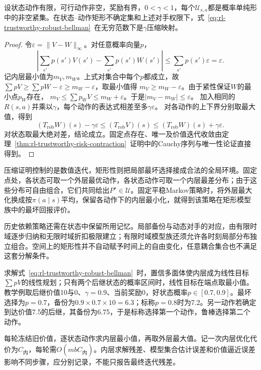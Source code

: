 \begin{theorem}[矩形鲁棒Bellman算子的压缩性]
  \label{thm:rl-trustworthy-robust-contraction}
  设状态动作有限，可行动作非空，奖励有界，$0<\gamma<1$，每个$\mathcal U_{s,a}$都是概率单纯形中的非空紧集。在状态--动作矩形不确定集和上述对手权限下，式~\eqref{eq:rl-trustworthy-robust-bellman}~在无穷范数下是$\gamma$压缩映射。
\end{theorem}
\begin{proof}
  令$\varepsilon=\lVert V-W\rVert_\infty$。对任意概率向量$p$，
  \[
    \left|\sum_{s'}p(s')V(s')-\sum_{s'}p(s')W(s')\right|
      \leq\sum_{s'}p(s')\varepsilon=\varepsilon.
  \]
  记内层最小值为$m_V,m_W$。上式对集合中每个$p$都成立，故
  $\sum pV\geq\sum pW-\varepsilon\geq m_W-\varepsilon$，取最小值得
  $m_V\geq m_W-\varepsilon$。由于紧性保证$W$的最小点$p_W$存在，
  $m_V\leq\sum p_WV\leq m_W+\varepsilon$。于是$|m_V-m_W|\leq\varepsilon$。
  加入相同的$R(s,a)$并乘以$\gamma$，每个动作的表达式相差至多$\gamma\varepsilon$。
  对各动作的上下界分别取最大值，得到
  \[
    (T_{\mathrm{rob}}W)(s)-\gamma\varepsilon
      \leq(T_{\mathrm{rob}}V)(s)
      \leq(T_{\mathrm{rob}}W)(s)+\gamma\varepsilon.
  \]
  对状态取最大绝对差，结论成立。固定点存在、唯一及价值迭代收敛由定理~\ref{thm:rl-trustworthy-risk-contraction}~证明中的Cauchy序列与唯一性论证直接得到。
\end{proof}

压缩证明控制的是数值迭代，矩形性则把局部最坏选择接成合法的全局环境。固定点处，各状态可取一个外层最优动作，各状态动作可取一个内层最差分布；由于这些分布可自由组合，它们共同给出$P^\star\in\mathcal U$。固定平稳Markov策略时，将外层最大化换成按$\pi(a\mid s)$平均，保留各动作下的内层最小化，就得到该策略在矩形模型族中的最坏回报评价。

历史依赖策略还需在状态中保留所用记忆。局部备份与动态对手的对应，由有限时域逐步归纳和无限时域折扣极限建立；有限时域模型族还须允许各时刻局部分布独立组合。空间上的矩形性并不自动赋予时间上的自由变化，任意耦合集合也不满足这套分解条件。

求解式~\eqref{eq:rl-trustworthy-robust-bellman}~时，置信多面体使内层成为线性目标$\sum pV$的线性规划；只有两个后继状态的概率区间时，线性目标在端点取最小值。教学例取后继价值10与0、$\gamma=0.9$、当前奖励0，好状态概率$p\in[0.7,0.9]$。最坏选择为$p=0.7$，备份为$0.9\times0.7\times10=6.3$；标称$p=0.8$时为7.2。另一动作若确定到达价值7.5的后继，其备份为6.75，于是标称选择第一个动作，鲁棒选择第二个动作。

每轮冻结旧价值，逐状态动作求内层最小值，再取外层最大值。记一次内层优化代价为$C_{\text{内}}$，每轮需$O(mbC_{\text{内}})$。内层求解残差、模型集合估计误差和价值逼近误差影响不同步骤，应分别记录，不能只报告最终迭代残差。

